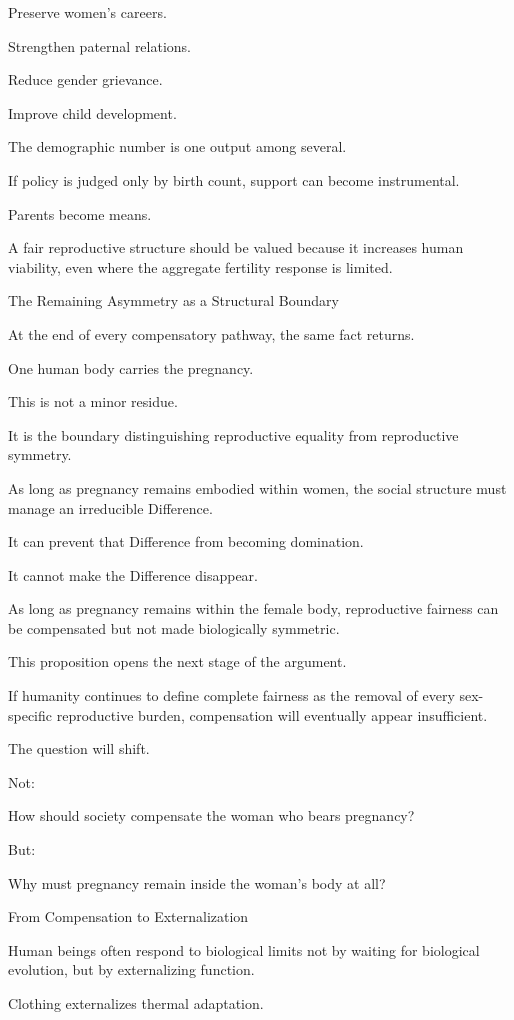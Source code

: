 Preserve women’s careers.

Strengthen paternal relations.

Reduce gender grievance.

Improve child development.

The demographic number is one output among several.

If policy is judged only by birth count, support can become instrumental.

Parents become means.

A fair reproductive structure should be valued because it increases human viability, even where the aggregate fertility response is limited.

The Remaining Asymmetry as a Structural Boundary

At the end of every compensatory pathway, the same fact returns.

One human body carries the pregnancy.

This is not a minor residue.

It is the boundary distinguishing reproductive equality from reproductive symmetry.

As long as pregnancy remains embodied within women, the social structure must manage an irreducible Difference.

It can prevent that Difference from becoming domination.

It cannot make the Difference disappear.

As long as pregnancy remains within the female body, reproductive fairness can be compensated but not made biologically symmetric.

This proposition opens the next stage of the argument.

If humanity continues to define complete fairness as the removal of every sex-specific reproductive burden, compensation will eventually appear insufficient.

The question will shift.

Not:

How should society compensate the woman who bears pregnancy?

But:

Why must pregnancy remain inside the woman’s body at all?

From Compensation to Externalization

Human beings often respond to biological limits not by waiting for biological evolution, but by externalizing function.

Clothing externalizes thermal adaptation.

